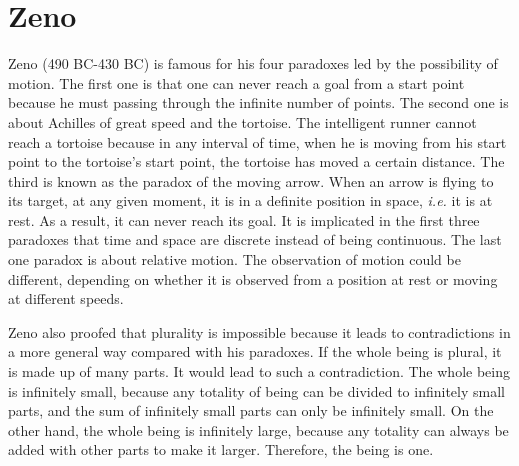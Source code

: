 \documentclass[11pt]{article}
\begin{document}
\begin{sloppypar}
\section{Zeno}
Zeno (490 BC-430 BC) is famous for his four paradoxes led by the possibility of motion. 
The first one is that one can never reach a goal from a start point because he must passing through the infinite number of points. 
The second one is about Achilles of great speed and the tortoise. 
The intelligent runner cannot reach a tortoise because in any interval of time, when he is moving from his start point to the tortoise’s start point, the tortoise has moved a certain distance. 
The third is known as the paradox of the moving arrow. 
When an arrow is flying to its target, at any given moment, it is in a definite position in space, \textit{i.e.} it is at rest. 
As a result, it can never reach its goal. 
It is implicated in the first three paradoxes that time and space are discrete instead of being continuous. 
The last one paradox is about relative motion. 
The observation of motion could be different, depending on whether it is observed from a position at rest or moving at different speeds. 

\par

Zeno also proofed that plurality is impossible because it leads to contradictions in a more general way compared with his paradoxes. 
If the whole being is plural, it is made up of many parts. 
It would lead to such a contradiction. 
The whole being is infinitely small, because any totality of being can be divided to infinitely small parts, and the sum of infinitely small parts can only be infinitely small. 
On the other hand, the whole being is infinitely large, because any totality can always be added with other parts to make it larger. 
Therefore, the being is one.
\end{sloppypar}
\end{document}
